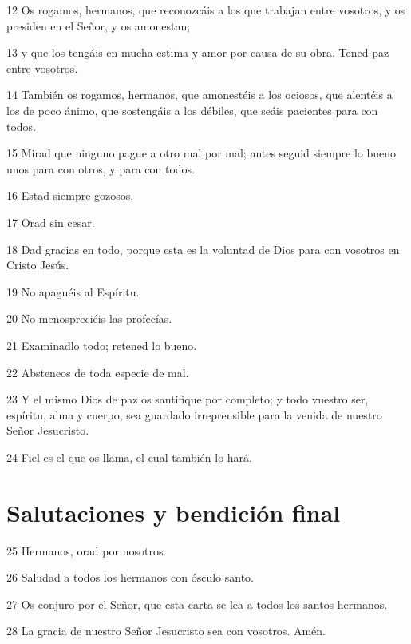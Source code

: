 \par 12 Os rogamos, hermanos, que reconozcáis a los que trabajan entre vosotros, y os presiden en el Señor, y os amonestan;
\par 13 y que los tengáis en mucha estima y amor por causa de su obra. Tened paz entre vosotros.
\par 14 También os rogamos, hermanos, que amonestéis a los ociosos, que alentéis a los de poco ánimo, que sostengáis a los débiles, que seáis pacientes para con todos.
\par 15 Mirad que ninguno pague a otro mal por mal; antes seguid siempre lo bueno unos para con otros, y para con todos.
\par 16 Estad siempre gozosos.
\par 17 Orad sin cesar.
\par 18 Dad gracias en todo, porque esta es la voluntad de Dios para con vosotros en Cristo Jesús.
\par 19 No apaguéis al Espíritu.
\par 20 No menospreciéis las profecías.
\par 21 Examinadlo todo; retened lo bueno.
\par 22 Absteneos de toda especie de mal.
\par 23 Y el mismo Dios de paz os santifique por completo; y todo vuestro ser, espíritu, alma y cuerpo, sea guardado irreprensible para la venida de nuestro Señor Jesucristo.
\par 24 Fiel es el que os llama, el cual también lo hará.

\section*{Salutaciones y bendición final}

\par 25 Hermanos, orad por nosotros.
\par 26 Saludad a todos los hermanos con ósculo santo.
\par 27 Os conjuro por el Señor, que esta carta se lea a todos los santos hermanos.
\par 28 La gracia de nuestro Señor Jesucristo sea con vosotros. Amén.

